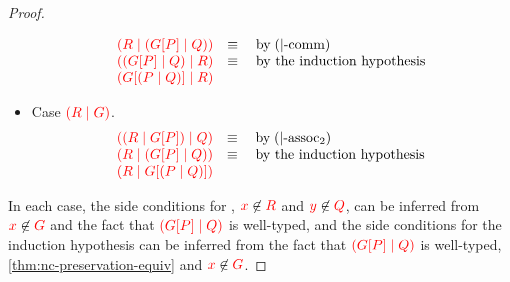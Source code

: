 \begin{proof}
\begin{itemize}
\[\begin{array}{ll}
        \textcolor{red}{(R \mid ({G}[{P}] \mid Q))} & \equiv \quad \text{by} \; (|\text{-comm}) \\
        \textcolor{red}{(({G}[{P}] \mid Q) \mid R)} & \equiv \quad \text{by the induction hypothesis} \\
        \textcolor{red}{({G}[{(P \mid Q)}] \mid R)} &
      \end{array}
    \]
  \item
    Case $\textcolor{red}{(R \mid G)}$.
    \[\!
      \begin{array}{ll}
        \textcolor{red}{((R \mid {G}[{P}]) \mid Q)} & \equiv \quad \text{by} \; (|\text{-assoc}_2) \\
        \textcolor{red}{(R \mid ({G}[{P}] \mid Q))} & \equiv \quad \text{by the induction hypothesis} \\
        \textcolor{red}{(R \mid {G}[{(P \mid Q)}])} &
      \end{array}
    \]
  \end{itemize}
  In each case, the side conditions for , $\textcolor{red}{x}\not\in\textcolor{red}{R}$ and
  $\textcolor{red}{y}\not\in\textcolor{red}{Q}$, can be inferred from $\textcolor{red}{x}\not\in\textcolor{red}{G}$ and the fact that
  $\textcolor{red}{({G}[{P}] \mid Q)}$ is well-typed, and the side conditions for
  the induction hypothesis can be inferred from the fact that
  $\textcolor{red}{({G}[{P}] \mid Q)}$ is well-typed,
  \cref{thm:nc-preservation-equiv} and $\textcolor{red}{x}\not\in\textcolor{red}{G}$. 
\end{proof}
